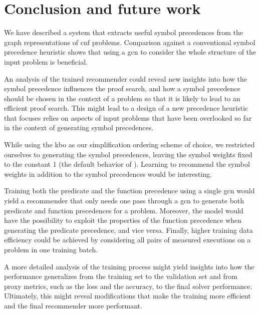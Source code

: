 \documentclass[runningheads]{llncs}
\begin{document}

\section{Conclusion and future work}
\label{sec:conclusion}

We have described a system that extracts useful symbol precedences from the graph representations of \gls{cnf} problems.
Comparison against a conventional symbol precedence heuristic shows that using a \gls{gcn}
to consider the whole structure of the input problem is beneficial.

An analysis of the trained recommender could reveal new insights into how the symbol precedence influences the proof search,
and how a symbol precedence should be chosen in the context of a problem so that it is likely to lead to an efficient proof search.
This might lead to a design of a new precedence heuristic
that focuses relies on aspects of input problems
that have been overlooked so far in the context of generating symbol precedences.

While using the \gls{kbo} as our simplification ordering scheme of choice,
we restricted ourselves to generating the symbol precedences,
leaving the symbol weights fixed to the constant 1 (the default behavior of \Vampire{}).
Learning to recommend the symbol weights in addition to the symbol precedences would be interesting.

Training both the predicate and the function precedence using a single \gls{gcn} would yield a recommender
that only needs one pass through a \gls{gcn} to generate both predicate and function precedences for a problem.
Moreover, the model would have the possibility to exploit the properties of the function precedence
when generating the predicate precedence, and vice versa.
Finally, higher training data efficiency could be achieved by considering all pairs of measured executions on a problem
in one training batch.

A more detailed analysis of the training process might yield insights into how the performance generalizes
from the training set to the validation set
and from proxy metrics, such as the loss and the accuracy, to the final solver performance.
Ultimately, this might reveal modifications that make the training more efficient and the final recommender more performant.
\end{document}
